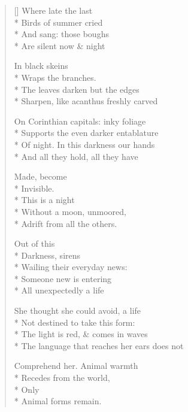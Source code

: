 \label{ch:out_of_this}
\settowidth{\versewidth}{The language that reaches her ears does not}
\begin{verse}[\versewidth]
Where late the last\\*
Birds of summer cried\\*
And sang: those boughs\\*
Are silent now \& night

In black skeins\\*
Wraps the branches.\\*
The leaves darken but the edges \\*
Sharpen, like acanthus freshly carved

On Corinthian capitals: inky foliage\\*
Supports the even darker entablature\\*
Of night. In this darkness our hands\\*
And all they hold, all they have

Made, become\\*
Invisible.\\*
                This is a night\\*
Without a moon, unmoored,\\*
Adrift from all the others.

\hspace{4\vgap} Out of this\\*
Darkness, sirens\\*
Wailing their everyday news:\\*
Someone new is entering\\*
All unexpectedly a life

She thought she could avoid, a life\\*
Not destined to take this form:\\*
The light is red, \& comes in waves\\*
The language that reaches her ears does not

Comprehend her.  Animal warmth\\*
Recedes from the world,\\*
Only\\*
Animal forms remain.
\end{verse}
